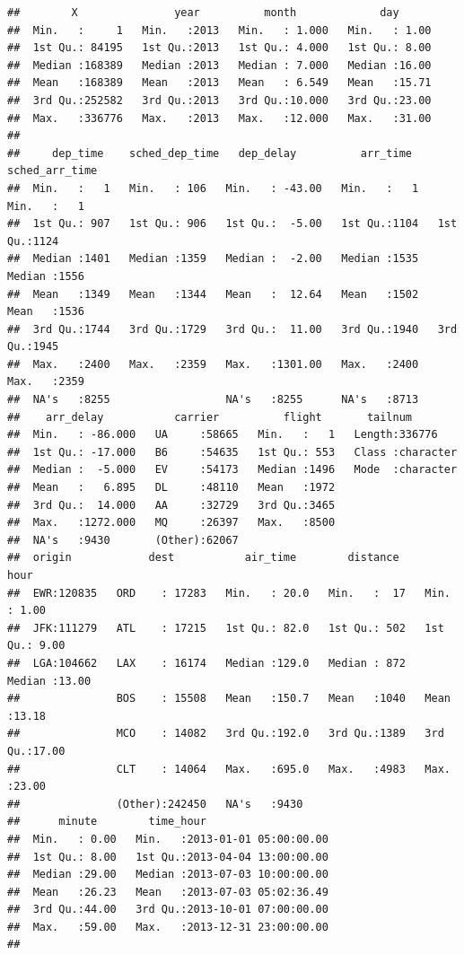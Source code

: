 \documentclass[
]{book}
\begin{document}
\begin{verbatim}
##        X               year          month             day       
##  Min.   :     1   Min.   :2013   Min.   : 1.000   Min.   : 1.00  
##  1st Qu.: 84195   1st Qu.:2013   1st Qu.: 4.000   1st Qu.: 8.00  
##  Median :168389   Median :2013   Median : 7.000   Median :16.00  
##  Mean   :168389   Mean   :2013   Mean   : 6.549   Mean   :15.71  
##  3rd Qu.:252582   3rd Qu.:2013   3rd Qu.:10.000   3rd Qu.:23.00  
##  Max.   :336776   Max.   :2013   Max.   :12.000   Max.   :31.00  
##                                                                  
##     dep_time    sched_dep_time   dep_delay          arr_time    sched_arr_time
##  Min.   :   1   Min.   : 106   Min.   : -43.00   Min.   :   1   Min.   :   1  
##  1st Qu.: 907   1st Qu.: 906   1st Qu.:  -5.00   1st Qu.:1104   1st Qu.:1124  
##  Median :1401   Median :1359   Median :  -2.00   Median :1535   Median :1556  
##  Mean   :1349   Mean   :1344   Mean   :  12.64   Mean   :1502   Mean   :1536  
##  3rd Qu.:1744   3rd Qu.:1729   3rd Qu.:  11.00   3rd Qu.:1940   3rd Qu.:1945  
##  Max.   :2400   Max.   :2359   Max.   :1301.00   Max.   :2400   Max.   :2359  
##  NA's   :8255                  NA's   :8255      NA's   :8713                 
##    arr_delay           carrier          flight       tailnum         
##  Min.   : -86.000   UA     :58665   Min.   :   1   Length:336776     
##  1st Qu.: -17.000   B6     :54635   1st Qu.: 553   Class :character  
##  Median :  -5.000   EV     :54173   Median :1496   Mode  :character  
##  Mean   :   6.895   DL     :48110   Mean   :1972                     
##  3rd Qu.:  14.000   AA     :32729   3rd Qu.:3465                     
##  Max.   :1272.000   MQ     :26397   Max.   :8500                     
##  NA's   :9430       (Other):62067                                    
##  origin            dest           air_time        distance         hour      
##  EWR:120835   ORD    : 17283   Min.   : 20.0   Min.   :  17   Min.   : 1.00  
##  JFK:111279   ATL    : 17215   1st Qu.: 82.0   1st Qu.: 502   1st Qu.: 9.00  
##  LGA:104662   LAX    : 16174   Median :129.0   Median : 872   Median :13.00  
##               BOS    : 15508   Mean   :150.7   Mean   :1040   Mean   :13.18  
##               MCO    : 14082   3rd Qu.:192.0   3rd Qu.:1389   3rd Qu.:17.00  
##               CLT    : 14064   Max.   :695.0   Max.   :4983   Max.   :23.00  
##               (Other):242450   NA's   :9430                                  
##      minute        time_hour                     
##  Min.   : 0.00   Min.   :2013-01-01 05:00:00.00  
##  1st Qu.: 8.00   1st Qu.:2013-04-04 13:00:00.00  
##  Median :29.00   Median :2013-07-03 10:00:00.00  
##  Mean   :26.23   Mean   :2013-07-03 05:02:36.49  
##  3rd Qu.:44.00   3rd Qu.:2013-10-01 07:00:00.00  
##  Max.   :59.00   Max.   :2013-12-31 23:00:00.00  
## 
\end{verbatim}
\end{document}
